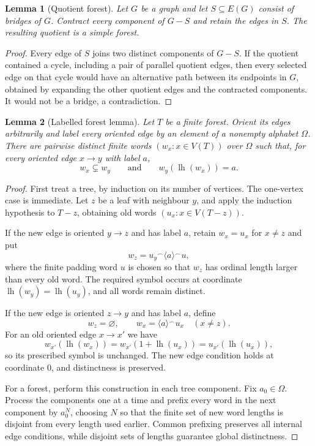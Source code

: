 \documentclass[11pt]{amsart}
\newtheorem{lemma}[lemma]{Lemma}
\theoremstyle{definition}
\theoremstyle{remark}
\numberwithin{equation}{section}
\newcommand{\lh}{\operatorname{lh}}
\newcommand{\concat}{\mathbin{{}^\frown}}
\begin{document}
\begin{lemma}[Quotient forest]
\label{lem:quotient-forest}
Let $G$ be a graph and let $S\subseteq E(G)$ consist of bridges of $G$.
Contract every component of $G-S$ and retain the edges in $S$.  The
resulting quotient is a simple forest.
\end{lemma}

\begin{proof}
Every edge of $S$ joins two distinct components of $G-S$.  If the
quotient contained a cycle, including a pair of parallel quotient edges,
then every selected edge on that cycle would have an alternative path
between its endpoints in $G$, obtained by expanding the other quotient
edges and the contracted components.  It would not be a bridge, a
contradiction.
\end{proof}

\begin{lemma}[Labelled forest lemma]
\label{lem:labelled-forest}
Let $T$ be a finite forest.  Orient its edges arbitrarily and label every
oriented edge by an element of a nonempty alphabet $\Omega$.  There are
pairwise distinct finite words $(w_x:x\in V(T))$ over $\Omega$ such that,
for every oriented edge $x\to y$ with label $a$,
\[
 w_x\subsetneq w_y
 \qquad\text{and}\qquad
 w_y(\lh(w_x))=a.
\]
\end{lemma}

\begin{proof}
First treat a tree, by induction on its number of vertices.  The
one-vertex case is immediate.  Let $z$ be a leaf with neighbour $y$, and
apply the induction hypothesis to $T-z$, obtaining old words
$(u_x:x\in V(T-z))$.

If the new edge is oriented $y\to z$ and has label $a$, retain
$w_x=u_x$ for $x\ne z$ and put
\[
 w_z=u_y\concat\langle a\rangle\concat u,
\]
where the finite padding word $u$ is chosen so that $w_z$ has ordinal
length larger than every old word.  The required symbol occurs at
coordinate $\lh(w_y)=\lh(u_y)$, and all words remain distinct.

If the new edge is oriented $z\to y$ and has label $a$, define
\[
 w_z=\varnothing,
 \qquad
 w_x=\langle a\rangle\concat u_x\quad(x\ne z).
\]
For an old oriented edge $x\to x'$ we have
\[
 w_{x'}(\lh(w_x))
 =w_{x'}(1+\lh(u_x))
 =u_{x'}(\lh(u_x)),
\]
so its prescribed symbol is unchanged.  The new edge condition holds at
coordinate $0$, and distinctness is preserved.

For a forest, perform this construction in each tree component.  Fix
$a_0\in\Omega$.  Process the components one at a time and prefix every
word in the next component by $a_0^N$, choosing $N$ so that the finite
set of new word lengths is disjoint from every length used earlier.
Common prefixing preserves all internal edge conditions, while disjoint
sets of lengths guarantee global distinctness.
\end{proof}
\end{document}
